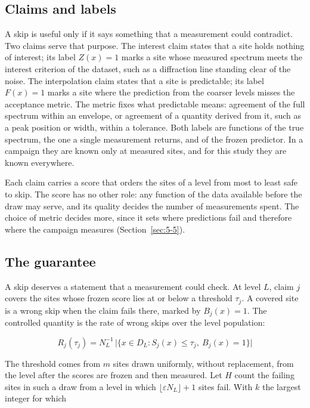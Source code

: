 \documentclass{iopjournal}
\begin{document}
\hypertarget{sec:3-2}{%
\subsection{Claims and labels}\label{sec:3-2}}

A skip is useful only if it says something that a measurement could contradict. Two claims serve that purpose. The interest claim states that a site holds nothing of interest; its label \(Z(x) = 1\) marks a site whose measured spectrum meets the interest criterion of the dataset, such as a diffraction line standing clear of the noise. The interpolation claim states that a site is predictable; its label \(F(x) = 1\) marks a site where the prediction from the coarser levels misses the acceptance metric. The metric fixes what predictable means: agreement of the full spectrum within an envelope, or agreement of a quantity derived from it, such as a peak position or width, within a tolerance. Both labels are functions of the true spectrum, the one a single measurement returns, and of the frozen predictor. In a campaign they are known only at measured sites, and for this study they are known everywhere.

Each claim carries a score that orders the sites of a level from most to least safe to skip. The score has no other role: any function of the data available before the draw may serve, and its quality decides the number of measurements spent. The choice of metric decides more, since it sets where predictions fail and therefore where the campaign measures (Section~\ref{sec:5-5}).

\hypertarget{sec:3-3}{%
\subsection{The guarantee}\label{sec:3-3}}

A skip deserves a statement that a measurement could check. At level \(L\), claim \(j\) covers the sites whose frozen score lies at or below a threshold \(\tau_j\). A covered site is a wrong skip when the claim fails there, marked by \(B_j(x) = 1\). The controlled quantity is the rate of wrong skips over the level population:

\[
R_j(\tau_j) = N_L^{-1} \, \lvert \{x \in D_L : S_j(x) \le \tau_j,\ B_j(x) = 1\} \rvert
\]

The threshold comes from \(m\) sites drawn uniformly, without replacement, from the level after the scores are frozen and then measured. Let \(H\) count the failing sites in such a draw from a level in which \(\lfloor \varepsilon N_L \rfloor + 1\) sites fail. With \(k\) the largest integer for which
\end{document}
